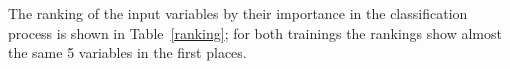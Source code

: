 
The ranking of the input variables by their importance in the classification process is shown in Table~\ref{ranking}; for both trainings the rankings show almost the same 5 variables in the first places.


